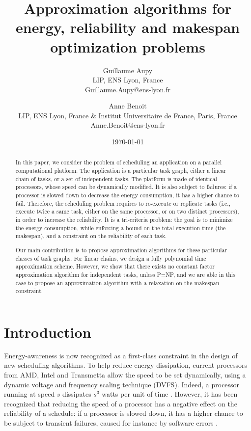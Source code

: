 \documentclass[a4paper]{article}
\title{Approximation algorithms for energy, reliability and makespan
  optimization problems}
\author{Guillaume Aupy\\
   LIP, ENS Lyon, France\\
   Guillaume.Aupy@ens-lyon.fr \\
   \and
   Anne Benoit \\
   LIP, ENS Lyon, France \& Institut Universitaire de France, Paris, France \\
   Anne.Benoit@ens-lyon.fr \\
   }
\date{\today}
\theoremstyle{plain}
\theoremstyle{definition}
\theoremstyle{remark}
\begin{document}
\maketitle

\begin{abstract}
  In this paper, we consider the problem of scheduling an application
  on a parallel computational platform. The application is a
  particular task graph, either a linear chain of tasks, or a set of
  independent tasks. The platform is made of identical processors,
  whose speed can be dynamically modified. It is also subject to
  failures: if a processor is slowed down to decrease the energy
  consumption, it has a higher chance to fail. Therefore, the
  scheduling problem requires to re-execute or replicate tasks (i.e.,
  execute twice a same task, either on the same processor, or on two
  distinct processors), in order to increase the reliability. It is a
  tri-criteria problem: the goal is to minimize the energy
  consumption, while enforcing a bound on the total execution time
  (the makespan), and a constraint on the reliability of each task. 

  Our main contribution is to propose approximation algorithms for
  these particular classes of task graphs.  For linear chains, we
  design a fully polynomial time approximation scheme. However, we
  show that there exists no constant factor approximation algorithm
  for independent tasks, unless P=NP, and we are able in this case to
  propose an approximation algorithm with a relaxation on the makespan
  constraint.
\end{abstract}




\section{Introduction}
\label{sec.intro}

Energy-awareness is now recognized as a first-class constraint in the
design of new scheduling algorithms. To help reduce energy
dissipation, current processors from AMD, Intel and Transmetta allow
the speed to be set dynamically, using a dynamic voltage and frequency
scaling technique (DVFS). Indeed, a processor running at speed $s$
dissipates $s^3$ watts per unit of time \cite{pow3IPDPS}.  However,
it has been recognized that reducing the speed of a processor has a
negative effect on the reliability of a schedule: if a processor is
slowed down, it has a higher chance to be subject to transient
failures, caused for instance by software errors 
\cite{Zhu04EEM,Degal05SEI}. 
\end{document}
